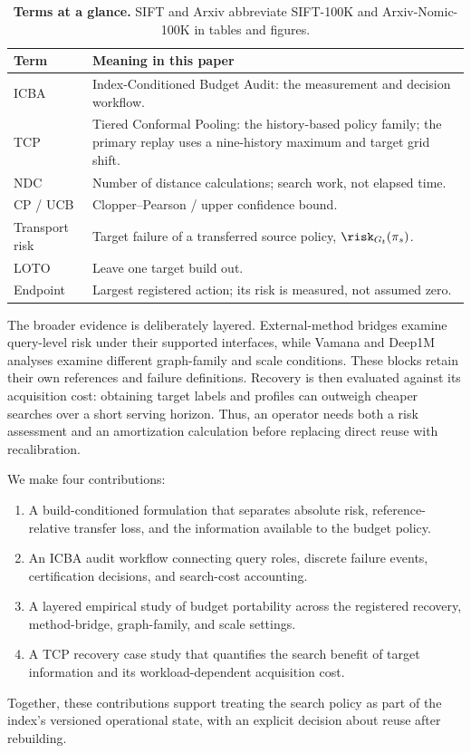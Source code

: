 \begin{table}[t]
\caption*{\textbf{Terms at a glance.} SIFT and Arxiv abbreviate SIFT-100K and Arxiv-Nomic-100K in tables and figures.}
\small
\begin{tabularx}{\linewidth}{@{}lX@{}}
\toprule
Term & Meaning in this paper \\
\midrule
ICBA & Index-Conditioned Budget Audit: the measurement and decision workflow. \\
TCP & Tiered Conformal Pooling: the history-based policy family; the primary replay uses a nine-history maximum and target grid shift. \\
NDC & Number of distance calculations; search work, not elapsed time. \\
CP / UCB & Clopper--Pearson / upper confidence bound. \\
Transport risk & Target failure of a transferred source policy, $\risk_{G_t}(\pi_s)$. \\
LOTO & Leave one target build out. \\
Endpoint & Largest registered action; its risk is measured, not assumed zero. \\
\bottomrule
\end{tabularx}
\end{table}

The broader evidence is deliberately layered. External-method bridges examine query-level risk under their supported interfaces, while Vamana and Deep1M analyses examine different graph-family and scale conditions. These blocks retain their own references and failure definitions. Recovery is then evaluated against its acquisition cost: obtaining target labels and profiles can outweigh cheaper searches over a short serving horizon. Thus, an operator needs both a risk assessment and an amortization calculation before replacing direct reuse with recalibration.

We make four contributions:
\begin{enumerate}
\item A build-conditioned formulation that separates absolute risk, reference-relative transfer loss, and the information available to the budget policy.
\item An ICBA audit workflow connecting query roles, discrete failure events, certification decisions, and search-cost accounting.
\item A layered empirical study of budget portability across the registered recovery, method-bridge, graph-family, and scale settings.
\item A TCP recovery case study that quantifies the search benefit of target information and its workload-dependent acquisition cost.
\end{enumerate}
Together, these contributions support treating the search policy as part of the index's versioned operational state, with an explicit decision about reuse after rebuilding.
